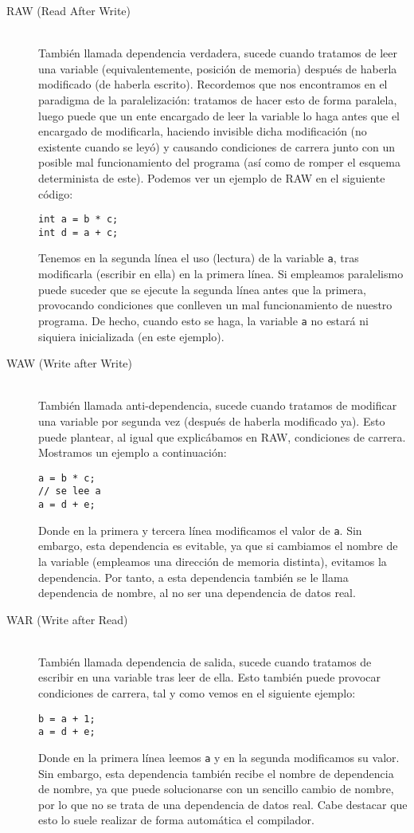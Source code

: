\begin{description}
    \item [RAW (Read After Write)]~\\
        También llamada dependencia verdadera, sucede cuando tratamos de leer una variable (equivalentemente, posición de memoria) después de haberla modificado (de haberla escrito). Recordemos que nos encontramos en el paradigma de la paralelización: tratamos de hacer esto de forma paralela, luego puede que un ente encargado de leer la variable lo haga antes que el encargado de modificarla, haciendo invisible dicha modificación (no existente cuando se leyó) y causando condiciones de carrera junto con un posible mal funcionamiento del programa (así como de romper el esquema determinista de este). Podemos ver un ejemplo de RAW en el siguiente código:
    \begin{verbatim}
int a = b * c;
int d = a + c;
    \end{verbatim}
Tenemos en la segunda línea el uso (lectura) de la variable \verb|a|, tras modificarla (escribir en ella) en la primera línea. Si empleamos paralelismo puede suceder que se ejecute la segunda línea antes que la primera, provocando condiciones que conlleven un mal funcionamiento de nuestro programa. De hecho, cuando esto se haga, la variable \verb|a| no estará ni siquiera inicializada (en este ejemplo).

    \item [WAW (Write after Write)]~\\
        También llamada anti-dependencia, sucede cuando tratamos de modificar una variable por segunda vez (después de haberla modificado ya). Esto puede plantear, al igual que explicábamos en RAW, condiciones de carrera. Mostramos un ejemplo a continuación:
    \begin{verbatim}
a = b * c;
// se lee a
a = d + e;
    \end{verbatim}
Donde en la primera y tercera línea modificamos el valor de \verb|a|. Sin embargo, esta dependencia es evitable, ya que si cambiamos el nombre de la variable (empleamos una dirección de memoria distinta), evitamos la dependencia. Por tanto, a esta dependencia también se le llama dependencia de nombre, al no ser una dependencia de datos real.

    \item [WAR (Write after Read)]~\\
        También llamada dependencia de salida, sucede cuando tratamos de escribir en una variable tras leer de ella. Esto también puede provocar condiciones de carrera, tal y como vemos en el siguiente ejemplo:
    \begin{verbatim}
b = a + 1;
a = d + e;
    \end{verbatim}
Donde en la primera línea leemos \verb|a| y en la segunda modificamos su valor. Sin embargo, esta dependencia también recibe el nombre de dependencia de nombre, ya que puede solucionarse con un sencillo cambio de nombre, por lo que no se trata de una dependencia de datos real. Cabe destacar que esto lo suele realizar de forma automática el compilador.
\end{description}

